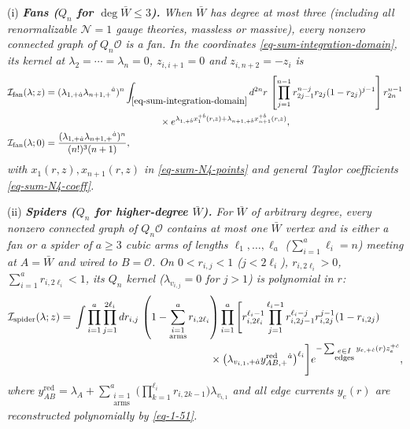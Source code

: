 \documentclass[11pt]{article}
\numberwithin{equation}{section}
\numberwithin{figure}{section}
\numberwithin{table}{section}
\begin{document}
(i) \emph{\textbf{Fans ($Q_n$ for $\deg\bar W\le3$).} When $\bar W$ has degree at most three (including all renormalizable $\mathcal N=1$ gauge theories, massless or massive), every nonzero connected graph of $Q_n\mathcal O$ is a fan. In the coordinates \eqref{eq-sum-integration-domain}, its kernel at $\lambda_2=\cdots=\lambda_n=0$, $z_{i,i+1}=0$ and $z_{i,n+2}=-z_i$ is}
\begin{equation}\label{eq-sum-fan-kernel-explicit}
\begin{aligned}
\mathcal I_{\mathrm{fan}}(\lambda;z)
={}&(\lambda_{1,+\dot a}\lambda_{n+1,+}{}^{\dot a})^n
\int_{\eqref{eq-sum-integration-domain}}d^{2n}r\,
\left[\prod_{j=1}^{n-1}r_{2j-1}^{n-j}r_{2j}(1-r_{2j})^{j-1}\right]r_{2n}^{n-1}\\
&\hspace{38mm}\times
e^{\lambda_{1,+\dot b}x_1^{+\dot b}(r,z)+\lambda_{n+1,+\dot b}x_{n+1}^{+\dot b}(r,z)},\\
\mathcal I_{\mathrm{fan}}(\lambda;0)
={}&\frac{(\lambda_{1,+\dot a}\lambda_{n+1,+}{}^{\dot a})^n}{(n!)^3(n+1)},
\end{aligned}
\end{equation}
\emph{with $x_1(r,z),x_{n+1}(r,z)$ in \eqref{eq-sum-N4-points} and general Taylor coefficients \eqref{eq-sum-N4-coeff}.}

(ii) \emph{\textbf{Spiders ($Q_n$ for higher-degree $\bar W$).} For $\bar W$ of arbitrary degree, every nonzero connected graph of $Q_n\mathcal O$ contains at most one $\bar W$ vertex and is either a fan or a spider of $a\ge3$ cubic arms of lengths $\ell_1,\ldots,\ell_a$ ($\sum_{i=1}^a\ell_i=n$) meeting at $A=\bar W$ and wired to $B=\mathcal O$. On $0<r_{i,j}<1$ ($j<2\ell_i$), $r_{i,2\ell_i}>0$, $\sum_{i=1}^a r_{i,2\ell_i}<1$, its $Q_n$ kernel ($\lambda_{v_{i,j}}=0$ for $j>1$) is polynomial in $r$:}
\begin{equation}\label{eq-sum-spider-kernel-explicit}
\begin{aligned}
\mathcal I_{\mathrm{spider}}(\lambda;z)
={}&\int\prod_{i=1}^a\prod_{j=1}^{2\ell_i}dr_{i,j}\,
\left(1-\sum_{\substack{i=1\\\text{arms}}}^{a}r_{i,2\ell_i}\right)
\prod_{i=1}^a\Bigg[r_{i,2\ell_i}^{\ell_i-1}
\prod_{j=1}^{\ell_i-1}r_{i,2j-1}^{\ell_i-j}r_{i,2j}^{j-1}(1-r_{i,2j})\\
&\hspace{46mm}\times\bigl(\lambda_{v_{i,1},+\dot a}y_{AB,+}^{\mathrm{red}}{}^{\dot a}\bigr)^{\ell_i}\Bigg]
e^{-\sum_{\substack{e\in I\\\text{edges}}}y_{e,+\dot c}(r)z_e^{+\dot c}},
\end{aligned}
\end{equation}
\emph{where $y_{AB}^{\mathrm{red}}=\lambda_A+\sum_{\substack{i=1\\\mathrm{arms}}}^a\bigl(\prod_{k=1}^{\ell_i}r_{i,2k-1}\bigr)\lambda_{v_{i,1}}$ and all edge currents $y_e(r)$ are reconstructed polynomially by \eqref{eq-1-51}.}
\end{document}
